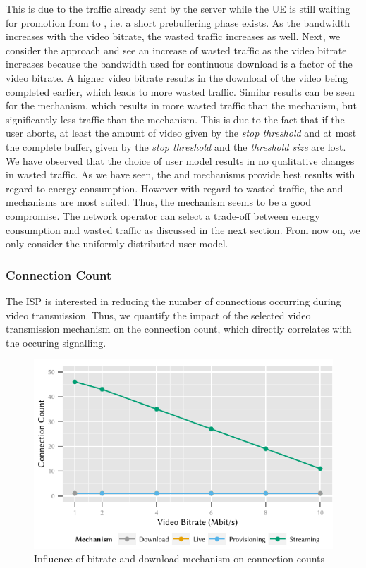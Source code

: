 This is due to the traffic already sent by the server while the \gls{UE} is still waiting for promotion from \rrcidle to \rrcconnected, i.e. a short prebuffering phase exists.
As the bandwidth increases with the video bitrate, the wasted traffic increases as well.
Next, we consider the \serviceprovisioning approach and see an increase of wasted traffic as the video bitrate increases because the bandwidth used for continuous download is a factor of the video bitrate.
A higher video bitrate results in the download of the video being completed earlier, which leads to more wasted traffic.
Similar results can be seen for the \streaming mechanism, which results in more wasted traffic than the \live mechanism, but significantly less traffic than the \serviceprovisioning mechanism.
This is due to the fact that if the user aborts, at least the amount of video given by the \emph{stop threshold} \bufferlower and at most the complete buffer, given by the \emph{stop threshold} and the \emph{threshold size} are lost.
We have observed that the choice of user model results in no qualitative changes in wasted traffic.
As we have seen, the \download and \streaming mechanisms provide best results with regard to energy consumption.
However with regard to wasted traffic, the \live and \streaming mechanisms are most suited.
Thus, the \streaming mechanism seems to be a good compromise.
The network operator can select a trade-off between energy consumption and wasted traffic as discussed in the next section.
From now on, we only consider the uniformly distributed user model.

\subsubsection*{Connection Count}\label{sec:application:lte_video:connection_count}
The \gls{ISP} is interested in reducing the number of connections occurring during video transmission.
Thus, we quantify the impact of the selected video transmission mechanism on the connection count, which directly correlates with the occuring signalling.
\begin{figure}
  \centering
  \includegraphics{application/lte_video/numerical_evaluation/figures/bitrate2connections}
  \caption{Influence of bitrate and download mechanism on connection counts}
  \label{fig:application:lte_video:numerical_evaluation:energy_consumption:bitrate2connections}
\end{figure}

